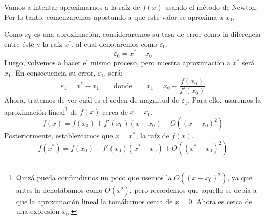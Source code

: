 \documentclass[12pt]{article}
\begin{document}
Vamos a intentar aproximarnos a la raíz de $f(x)$ usando el método de Newton. Por lo tanto, comenzaremos apostando a que este valor se aproxima a $x_{0}$.

Como $x_{0}$ es una aproximación, consideraremos su tasa de error como la diferencia entre éste y la raíz $x^{*}$, al cual denotaremos como $\varepsilon_{0}$.
\[\varepsilon_{0} = x^{*} - x_{0}\]
Luego, volvemos a hacer el mismo proceso, pero nuestra aproximación a $x^{*}$ será $x_{1}$. En consecuencia su error, $\varepsilon_{1}$, será:
\[
\varepsilon_{1} = x^{*} - x_{1}
	\qquad \text{donde} \qquad
x_{1} = x_{0} - \frac{f(x_{0})}{f'(x_{0})}
\]
Ahora, tratemos de ver cuál es el orden de magnitud de $\varepsilon_{1}$. Para ello, usaremos la aproximación lineal\footnote{Quizá pueda confundirnos un poco que usemos la $O((x - x_{0})^{2})$, ya que antes la denotábamos como $O(x^{2})$, pero recordemos que aquello se debía a que la aproximación lineal la tomábamos cerca de $x = 0$. Ahora es cerca de una expresión $x_{0}$.} de $f(x)$ cerca de $x = x_{0}$.
\[
	f(x) = f(x_{0}) + f'(x_{0})(x - x_{0}) + O((x - x_{0})^{2})
\]
Posteriormente, establezcamos que $x = x^{*}$, la raíz de $f(x)$.
\[
	f(x^{*}) = f(x_{0}) + f'(x_{0})(x^{*} - x_{0})
	           + O((x^{*} - x_{0})^{2})
\]

\newpage
\end{document}
